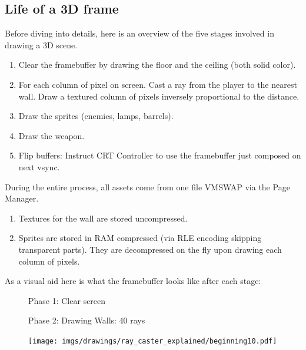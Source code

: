\subsection{Life of a 3D frame}
Before diving into details, here is an overview of the five stages involved in drawing a 3D scene.\\
\begin{enumerate}
 \item Clear the framebuffer by drawing the floor and the ceiling (both solid color).
 \item For each column of pixel on screen. Cast a ray from the player to the nearest wall. Draw a textured column of pixels inversely proportional to the distance.
 \item Draw the sprites (enemies, lamps, barrels).
 \item Draw the weapon.	
 \item Flip buffers: Instruct CRT Controller to use the framebuffer just composed on next vsync.
\end{enumerate}
During the entire process, all assets come from one file VMSWAP via the Page Manager.\\
\begin{enumerate}
	\item Textures for the wall are stored uncompressed.
	\item Sprites are stored in RAM compressed (via RLE encoding skipping transparent parts). They are decompressed on the fly upon drawing each column of pixels.
\end{enumerate}
As a visual aid here is what the framebuffer looks like after each stage:\\
\begin{figure}[H]
\centering
 \caption{Phase 1: Clear screen}
 \end{figure}




\begin{figure}[H]
 \centering
  \caption{Phase 2: Drawing Walls: 40 rays} 
\end{figure}
\begin{minipage}{.4\textwidth}
 \end{minipage}
\begin{minipage}{.6\textwidth}
\begin{figure}[H]
  \centering
 \texttt{[image: imgs/drawings/ray\_caster\_explained/beginning10.pdf]}
   
\end{figure}
\end{minipage}





